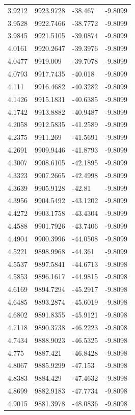 \begin{table}[H]
\begin{tabular}{llll}
3.9212 & 9923.9728 & -38.467 & -9.8099 \\
3.9528 & 9922.7466 & -38.7772 & -9.8099 \\
3.9845 & 9921.5105 & -39.0874 & -9.8099 \\
4.0161 & 9920.2647 & -39.3976 & -9.8099 \\
4.0477 & 9919.009 & -39.7078 & -9.8099 \\
4.0793 & 9917.7435 & -40.018 & -9.8099 \\
4.111 & 9916.4682 & -40.3282 & -9.8099 \\
4.1426 & 9915.1831 & -40.6385 & -9.8099 \\
4.1742 & 9913.8882 & -40.9487 & -9.8099 \\
4.2058 & 9912.5835 & -41.2589 & -9.8099 \\
4.2375 & 9911.269 & -41.5691 & -9.8099 \\
4.2691 & 9909.9446 & -41.8793 & -9.8099 \\
4.3007 & 9908.6105 & -42.1895 & -9.8099 \\
4.3323 & 9907.2665 & -42.4998 & -9.8099 \\
4.3639 & 9905.9128 & -42.81 & -9.8099 \\
4.3956 & 9904.5492 & -43.1202 & -9.8099 \\
4.4272 & 9903.1758 & -43.4304 & -9.8099 \\
4.4588 & 9901.7926 & -43.7406 & -9.8099 \\
4.4904 & 9900.3996 & -44.0508 & -9.8099 \\
4.5221 & 9898.9968 & -44.361 & -9.8099 \\
4.5537 & 9897.5841 & -44.6713 & -9.8098 \\
4.5853 & 9896.1617 & -44.9815 & -9.8098 \\
4.6169 & 9894.7294 & -45.2917 & -9.8098 \\
4.6485 & 9893.2874 & -45.6019 & -9.8098 \\
4.6802 & 9891.8355 & -45.9121 & -9.8098 \\
4.7118 & 9890.3738 & -46.2223 & -9.8098 \\
4.7434 & 9888.9023 & -46.5325 & -9.8098 \\
4.775 & 9887.421 & -46.8428 & -9.8098 \\
4.8067 & 9885.9299 & -47.153 & -9.8098 \\
4.8383 & 9884.429 & -47.4632 & -9.8098 \\
4.8699 & 9882.9183 & -47.7734 & -9.8098 \\
4.9015 & 9881.3978 & -48.0836 & -9.8098 \\

\end{tabular}
\end{table}
